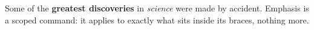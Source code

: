 \documentclass{article}
\begin{document}
Some of the \textbf{greatest discoveries} in \emph{science} were made
by accident. Emphasis is a scoped command: it applies to exactly what
sits inside its braces, nothing more.
\end{document}
